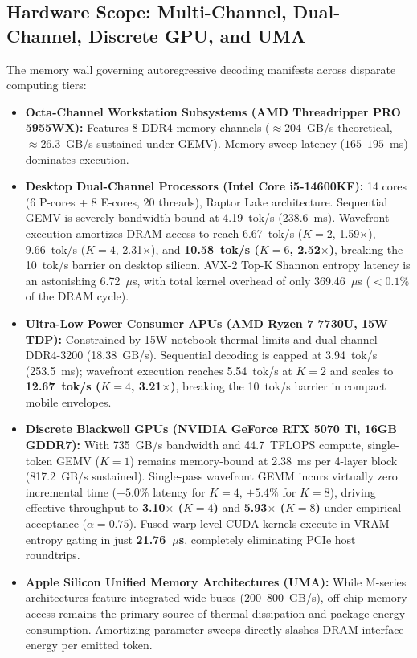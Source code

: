 \documentclass[journal,10pt,twocolumn]{article}
\theoremstyle{definition}
\begin{document}
\subsection{Hardware Scope: Multi-Channel, Dual-Channel, Discrete GPU, and UMA}
The memory wall governing autoregressive decoding manifests across disparate computing tiers:
\begin{itemize}
    \item \textbf{Octa-Channel Workstation Subsystems (AMD Threadripper PRO 5955WX):} Features 8 DDR4 memory channels ($\approx 204$~GB/s theoretical, $\approx 26.3$~GB/s sustained under GEMV). Memory sweep latency ($165\text{--}195$~ms) dominates execution.
    \item \textbf{Desktop Dual-Channel Processors (Intel Core i5-14600KF):} 14 cores (6 P-cores + 8 E-cores, 20 threads), Raptor Lake architecture. Sequential GEMV is severely bandwidth-bound at 4.19~tok/s (238.6~ms). Wavefront execution amortizes DRAM access to reach 6.67~tok/s ($K=2$, 1.59$\times$), 9.66~tok/s ($K=4$, 2.31$\times$), and \textbf{10.58~tok/s ($K=6$, 2.52$\times$)}, breaking the 10~tok/s barrier on desktop silicon. AVX-2 Top-K Shannon entropy latency is an astonishing 6.72~$\mu$s, with total kernel overhead of only 369.46~$\mu$s ($< 0.1\%$ of the DRAM cycle).
    \item \textbf{Ultra-Low Power Consumer APUs (AMD Ryzen 7 7730U, 15W TDP):} Constrained by 15W notebook thermal limits and dual-channel DDR4-3200 (18.38~GB/s). Sequential decoding is capped at 3.94~tok/s (253.5~ms); wavefront execution reaches 5.54~tok/s at $K=2$ and scales to \textbf{12.67~tok/s ($K=4$, 3.21$\times$)}, breaking the 10~tok/s barrier in compact mobile envelopes.
    \item \textbf{Discrete Blackwell GPUs (NVIDIA GeForce RTX 5070 Ti, 16GB GDDR7):} With 735~GB/s bandwidth and 44.7~TFLOPS compute, single-token GEMV ($K=1$) remains memory-bound at 2.38~ms per 4-layer block (817.2~GB/s sustained). Single-pass wavefront GEMM incurs virtually zero incremental time ($+5.0\%$ latency for $K=4$, $+5.4\%$ for $K=8$), driving effective throughput to \textbf{3.10$\times$ ($K=4$)} and \textbf{5.93$\times$ ($K=8$)} under empirical acceptance ($\alpha=0.75$). Fused warp-level CUDA kernels execute in-VRAM entropy gating in just \textbf{21.76~$\mu$s}, completely eliminating PCIe host roundtrips.
    \item \textbf{Apple Silicon Unified Memory Architectures (UMA):} While M-series architectures feature integrated wide buses ($200\text{--}800$~GB/s), off-chip memory access remains the primary source of thermal dissipation and package energy consumption. Amortizing parameter sweeps directly slashes DRAM interface energy per emitted token.
\end{itemize}
\end{document}
